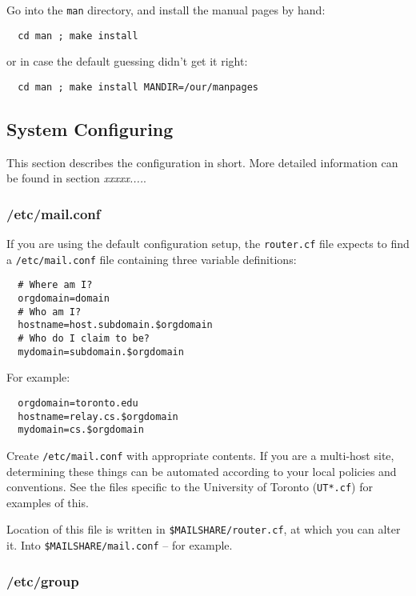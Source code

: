 Go into the {\tt man} directory, and install the manual pages by hand:
\begin{verbatim}
  cd man ; make install
\end{verbatim}

or in case the default guessing didn't get it right:
\begin{verbatim}
  cd man ; make install MANDIR=/our/manpages
\end{verbatim}

\subsection{System Configuring}

This section describes the configuration in short. More detailed information 
can be found in section {\em xxxxx....\/}.


\subsubsection{/etc/mail.conf}

If you are using the default configuration setup, the {\tt router.cf} file
expects to find a {\tt /etc/mail.conf} file containing three variable
definitions:
\begin{verbatim}
  # Where am I?
  orgdomain=domain
  # Who am I?
  hostname=host.subdomain.$orgdomain
  # Who do I claim to be?
  mydomain=subdomain.$orgdomain
\end{verbatim}

For example:
\begin{verbatim}
  orgdomain=toronto.edu
  hostname=relay.cs.$orgdomain
  mydomain=cs.$orgdomain
\end{verbatim}

Create {\tt /etc/mail.conf} with appropriate contents.  If you are a
multi-host site, determining these things can be automated according
to your local policies and conventions.  See the files specific to
the University of Toronto ({\tt UT*.cf}) for examples of this.

Location of this file is written in {\tt \$MAILSHARE/router.cf}, at which
you can alter it. Into {\tt \$MAILSHARE/mail.conf} -- for example.


\subsubsection{/etc/group}

